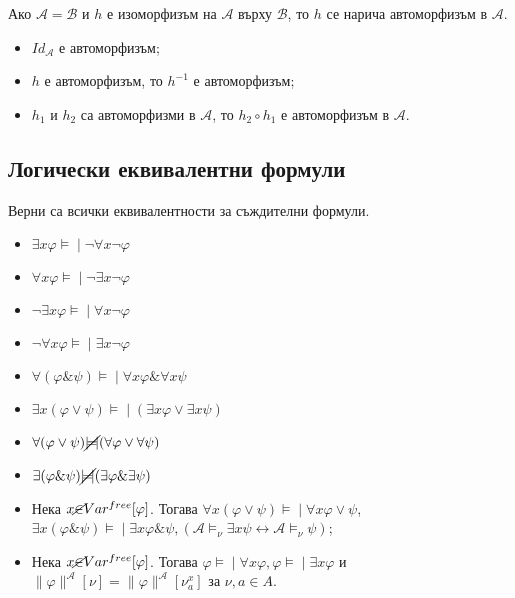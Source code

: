 \documentclass{article}
\newcommand{\mymod}{\models\!\mid}
\begin{document}
\begin{prop}[Автоморфизъм] 
Ако $\mathcal{A} = \mathcal{B}$ и $h$ е изоморфизъм на $\mathcal{A}$ върху $\mathcal{B}$, то $h$ се нарича автоморфизъм в $\mathcal{A}$.
\begin{itemize}
\item $I\!d_\mathcal{A}$ е автоморфизъм;
\item $h$ е автоморфизъм, то $h^{-1}$ е автоморфизъм;
\item $h_1$ и $h_2$ са автоморфизми в $\mathcal{A}$, то $h_2\circ h_1$ е автоморфизъм в $\mathcal{A}$.
\end{itemize}
\end{prop}

\subsection*{Логически еквивалентни формули}

\begin{prop}
Верни са всички еквивалентности за съждителни формули.
\begin{itemize}
\item $\exists x\varphi \mymod \neg\forall x\neg\varphi$
\item $\forall x\varphi \mymod \neg\exists x\neg\varphi$
\item $\neg\exists x\varphi \mymod \forall x\neg\varphi$
\item $\neg\forall x\varphi \mymod \exists x\neg\varphi$
\item $\forall(\varphi\&\psi) \mymod \forall x\varphi \& \forall x\psi$
\item $\exists x(\varphi \lor \psi) \mymod (\exists x\varphi \lor \exists x\psi)$
\item $\forall(\varphi \lor \psi) \cancel{\mymod} (\forall\varphi \lor \forall\psi)$
\item $\exists(\varphi \& \psi) \cancel{\mymod} (\exists\varphi \& \exists\psi)$
\item Нека $x \cancel{\in} Var^{free}[\varphi]$. Тогава $\forall x(\varphi \lor \psi) \mymod \forall x \varphi \lor \psi$, $\exists x(\varphi \& \psi) \mymod \exists x\varphi\&\psi, (\mathcal{A} \models_\nu \exists x\psi \longleftrightarrow \mathcal{A} \models_\nu \psi)$;
\item Нека $x \cancel{\in} Var^{free}[\varphi]$. Тогава $\varphi \mymod \forall x\varphi, \varphi \mymod \exists x\varphi$ и $\|\varphi\|^\mathcal{A}[\nu] = \|\varphi\|^\mathcal{A}[\nu^x_a]$ за $\nu, a \in A$.
\end{itemize}

\end{prop}
\end{document}
